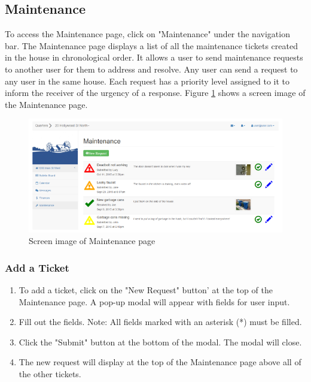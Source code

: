 \documentclass[12pt]{article}
\begin{document}
    \subsection{Maintenance}
    To access the Maintenance page, click on "Maintenance" under the navigation bar. The Maintenance page displays a list of all the maintenance tickets created in the house in chronological order. It  allows a user to send maintenance requests to another user for them to address and resolve. Any user can send a request to any user in the same house. Each request has a priority level assigned to it to inform the receiver of the urgency of a response. Figure \ref{fig:maintenance} shows a screen image of the Maintenance page.

    \begin{figure}
        \centering
        \includegraphics[width=\textwidth]{maintenance}
        \caption{Screen image of Maintenance page}
        \label{fig:maintenance}
    \end{figure}

    \subsubsection{Add a Ticket}
    \begin{enumerate}
        \item To add a ticket, click on the "New Request" button' at the top of the Maintenance page. A pop-up modal will appear with fields for user input.
        \item Fill out the fields. Note: All fields marked with an asterisk (*) must be filled.
        \item Click the "Submit" button at the bottom of the modal. The modal will close.
        \item The new request will display at the top of the Maintenance page above all of the other tickets.
    \end{enumerate}
\end{document}

